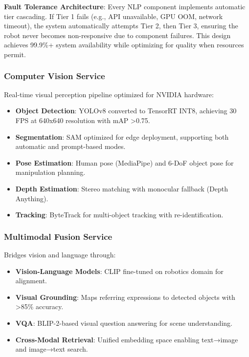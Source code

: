 \documentclass[conference]{IEEEtran}
\begin{document}
\textbf{Fault Tolerance Architecture}: Every NLP component implements automatic tier cascading. If Tier 1 fails (e.g., API unavailable, GPU OOM, network timeout), the system automatically attempts Tier 2, then Tier 3, ensuring the robot never becomes non-responsive due to component failures. This design achieves 99.9\%+ system availability while optimizing for quality when resources permit.

\subsubsection{Computer Vision Service}

Real-time visual perception pipeline optimized for NVIDIA hardware:

\begin{itemize}
    \item \textbf{Object Detection}: YOLOv8 converted to TensorRT INT8, achieving 30 FPS at 640x640 resolution with mAP >0.75.
    
    \item \textbf{Segmentation}: SAM optimized for edge deployment, supporting both automatic and prompt-based modes.
    
    \item \textbf{Pose Estimation}: Human pose (MediaPipe) and 6-DoF object pose for manipulation planning.
    
    \item \textbf{Depth Estimation}: Stereo matching with monocular fallback (Depth Anything).
    
    \item \textbf{Tracking}: ByteTrack for multi-object tracking with re-identification.
\end{itemize}

\subsubsection{Multimodal Fusion Service}

Bridges vision and language through:

\begin{itemize}
    \item \textbf{Vision-Language Models}: CLIP fine-tuned on robotics domain for alignment.
    
    \item \textbf{Visual Grounding}: Maps referring expressions to detected objects with >85\% accuracy.
    
    \item \textbf{VQA}: BLIP-2-based visual question answering for scene understanding.
    
    \item \textbf{Cross-Modal Retrieval}: Unified embedding space enabling text→image and image→text search.
\end{itemize}
\end{document}
